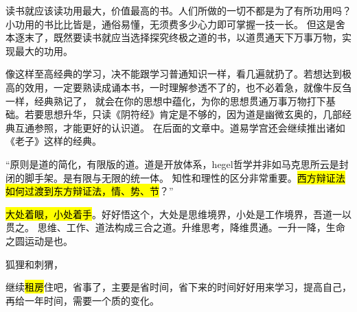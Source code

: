 \begin{shadequote}
读书就应该读功用最大，价值最高的书。人们所做的一切不都是为了有所功用吗？小功用的书比比皆是，通俗易懂，无须费多少心力即可掌握一技一长。
但这是舍本逐末了，既然要读书就应当选择探究终极之道的书，以道贯通天下万事万物，实现最大的功用。

像这样至高经典的学习，决不能跟学习普通知识一样，看几遍就扔了。若想达到极高的效用，一定要熟读成诵本书，一时理解参透不了的，也不必着急，就像牛反刍一样，经典熟记了，
就会在你的思想中蕴化，为你的思想贯通万事万物打下基础。若要思想升华，只读《阴符经》肯定是不够的，因为道是幽微玄奥的，几部经典互通参照，才能更好的认识道。
在后面的文章中。道易学宫还会继续推出诸如《老子》这样的经典。
\end{shadequote}


\enquote{原则是道的简化，有限版的道。道是开放体系，hegel哲学并非如马克思所云是封闭的脚手架。是有限与无限的统一体。
知性和理性的区分非常重要。\hl{西方辩证法如何过渡到东方辩证法，情、势、节}？}

\hrulefill

\hl{大处着眼，小处着手}。好好悟这个，大处是思维境界，小处是工作境界，吾道一以贯之。
思维、工作、道法构成三合之道。升维思考，降维贯通。一升一降，生命之圆运动是也。

狐狸和刺猬，

继续\hl{租房}住吧，省事了，主要是省时间，省下来的时间好好用来学习，提高自己，再给一年时间，需要一个质的变化。
